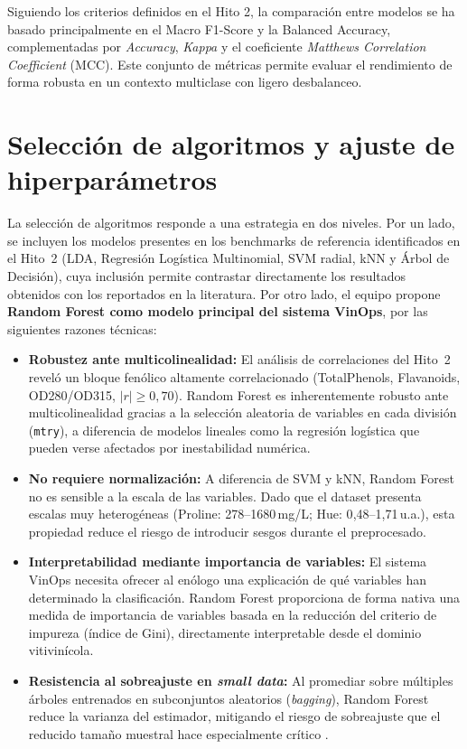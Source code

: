 Siguiendo los criterios definidos en el Hito 2, la comparación entre modelos se ha basado principalmente en el Macro F1-Score y la Balanced Accuracy, complementadas por \textit{Accuracy}, \textit{Kappa} y el coeficiente \textit{Matthews Correlation Coefficient} (MCC). Este conjunto de métricas permite evaluar el rendimiento de forma robusta en un contexto multiclase con ligero desbalanceo.

\section{Selección de algoritmos y ajuste de hiperparámetros}

La selecci\'on de algoritmos responde a una estrategia en dos niveles. Por
un lado, se incluyen los modelos presentes en los benchmarks de referencia
identificados en el Hito~2 (LDA, Regresi\'on Log\'istica Multinomial, SVM
radial, kNN y \'Arbol de Decisi\'on), cuya inclusi\'on permite contrastar
directamente los resultados obtenidos con los reportados en la literatura.
Por otro lado, el equipo propone \textbf{Random Forest como modelo principal
del sistema VinOps}, por las siguientes razones t\'ecnicas:

\begin{itemize}
    \item \textbf{Robustez ante multicolinealidad:} El an\'alisis de
    correlaciones del Hito~2 revel\'o un bloque fenólico altamente
    correlacionado (TotalPhenols, Flavanoids, OD280/OD315, $|r| \geq 0{,}70$).
    Random Forest es inherentemente robusto ante multicolinealidad gracias
    a la selecci\'on aleatoria de variables en cada divisi\'on (\texttt{mtry}),
    a diferencia de modelos lineales como la regresi\'on log\'istica que pueden
    verse afectados por inestabilidad num\'erica.

    \item \textbf{No requiere normalización:} A diferencia de SVM y kNN,
    Random Forest no es sensible a la escala de las variables. Dado que el
    dataset presenta escalas muy heterogéneas (Proline: 278--1680\,mg/L;
    Hue: 0{,}48--1{,}71\,u.a.), esta propiedad reduce el riesgo de introducir
    sesgos durante el preprocesado.

    \item \textbf{Interpretabilidad mediante importancia de variables:}
    El sistema VinOps necesita ofrecer al en\'ologo una explicaci\'on de 
    qu\'e variables han determinado la clasificaci\'on. Random Forest 
    proporciona de forma nativa una medida de importancia de
    variables basada en la reducci\'on del criterio de impureza (índice de Gini),
    directamente interpretable desde el dominio vitivin\'icola.

    \item \textbf{Resistencia al sobreajuste en \textit{small data}:}
    Al promediar sobre m\'ultiples \'arboles entrenados en subconjuntos
    aleatorios (\textit{bagging}), Random Forest reduce la varianza del
    estimador, mitigando el riesgo de sobreajuste que el reducido tama\~no
    muestral hace especialmente cr\'itico \cite{Breiman2001}.   
\end{itemize}

